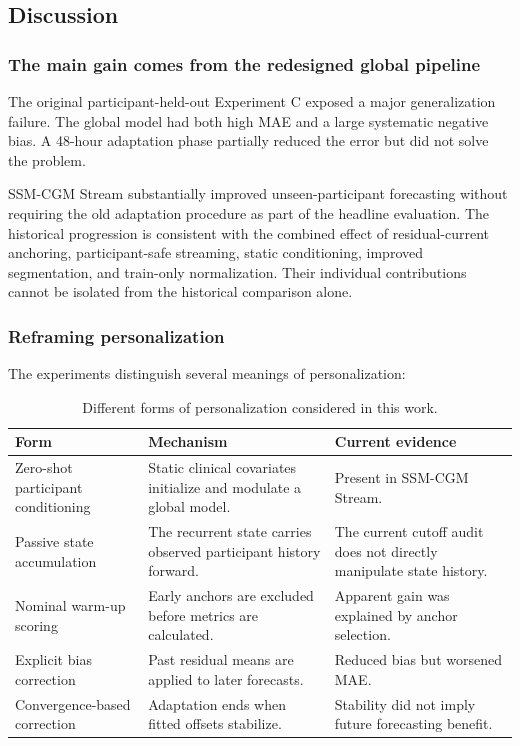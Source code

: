 \subsection{Discussion}
\label{subsec:forecasting_personalization_discussion}

\subsubsection{The main gain comes from the redesigned global pipeline}

The original participant-held-out Experiment C exposed a major generalization
failure. The global model had both high MAE and a large systematic negative
bias. A 48-hour adaptation phase partially reduced the error but did not solve
the problem.

SSM-CGM Stream substantially improved unseen-participant forecasting without
requiring the old adaptation procedure as part of the headline evaluation. The
historical progression is consistent with the combined effect of residual-current
anchoring, participant-safe streaming, static conditioning, improved
segmentation, and train-only normalization. Their individual contributions
cannot be isolated from the historical comparison alone.

\subsubsection{Reframing personalization}

The experiments distinguish several meanings of personalization:

\begin{table}[H]
\centering
\caption{Different forms of personalization considered in this work.}
\label{tab:personalization_definitions}
\begin{tabular}{p{}p{}p{}}
\toprule
Form & Mechanism & Current evidence \\
\midrule
Zero-shot participant conditioning
& Static clinical covariates initialize and modulate a global model.
& Present in SSM-CGM Stream. \\
Passive state accumulation
& The recurrent state carries observed participant history forward.
& The current cutoff audit does not directly manipulate state history. \\
Nominal warm-up scoring
& Early anchors are excluded before metrics are calculated.
& Apparent gain was explained by anchor selection. \\
Explicit bias correction
& Past residual means are applied to later forecasts.
& Reduced bias but worsened MAE. \\
Convergence-based correction
& Adaptation ends when fitted offsets stabilize.
& Stability did not imply future forecasting benefit. \\
\bottomrule
\end{tabular}
\end{table}

